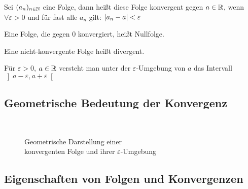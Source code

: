 \begin{definition}
    Sei $(a_n)_{n\in\mathbb{N}}$ eine Folge, dann heißt diese Folge konvergent gegen $a\in\mathbb{R}$, wenn $\forall \varepsilon > 0$ und für fast alle $a_n$ gilt: $\left\lvert a_n-a\right\rvert<\varepsilon$
\end{definition}

\begin{definition}[Nullfolge]
    Eine Folge, die gegen $0$ konvergiert, heißt Nullfolge.
\end{definition}

\begin{definition}[Divergenz]
    Eine nicht-konvergente Folge heißt divergent.
\end{definition}

\begin{definition}
    Für $\varepsilon > 0$, $a\in\mathbb{R}$ versteht man unter der $\varepsilon$-Umgebung von $a$ das Intervall $\left]a-\varepsilon, a+\varepsilon\right[$
\end{definition}

\subsection{Geometrische Bedeutung der Konvergenz}

\begin{visualisierung}
    ~
    \begin{figure}[H]
        \centering
        \caption{Geometrische Darstellung einer\\ konvergenten Folge und ihrer $\varepsilon$-Umgebung}
    \end{figure}
\end{visualisierung}


\subsection{Eigenschaften von Folgen und Konvergenzen}

